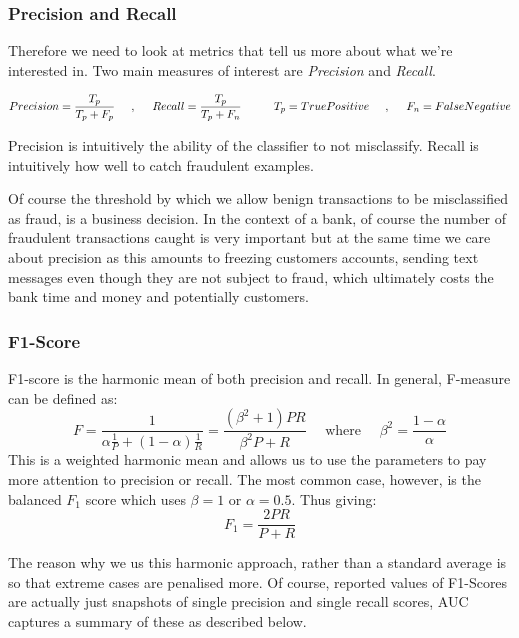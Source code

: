\documentclass[12pt,a4paper,twoside]{report}
\begin{document}
\subsubsection{Precision and Recall}

Therefore we need to look at metrics that tell us more about what we're interested in. Two main measures of interest are \textit{Precision} and \textit{Recall}.

\[
    {Precision} = \frac{T_p}{T_p+F_p} \hspace{5mm} , \hspace{5mm} {Recall} = \frac{T_p}{T_p+F_n} \hspace{1cm}  {T_p} = {True Positive} \hspace{5mm},\hspace{5mm} {F_n} = {False Negative}
\]

Precision is intuitively the ability of the classifier to not misclassify. Recall is intuitively how well to catch fraudulent examples. 

Of course the threshold by which we allow benign transactions to be misclassified as fraud, is a business decision. In the context of a bank, of course the number of fraudulent transactions caught is very important but at the same time we care about precision as this amounts to freezing customers accounts, sending text messages even though they are not subject to fraud, which ultimately costs the bank time and money and potentially customers.

\subsubsection{F1-Score}

F1-score is the harmonic mean of both precision and recall. In general, F-measure can be defined as:
$$F = \frac { 1} { \alpha \frac { 1} { P } + ( 1- \alpha ) \frac { 1} { R } } = \frac { \left( \beta ^ { 2} + 1\right) P R } { \beta ^ { 2} P + R } \quad \text{ where } \quad \beta ^ { 2} = \frac { 1- \alpha } { \alpha }$$
This is a weighted harmonic mean and allows us to use the parameters to pay more attention to precision or recall. The most common case, however, is the balanced $F_1$ score which uses $\beta = 1$ or $\alpha=0.5.$
Thus giving:
$$F _ { 1} = \frac { 2P R } { P + R }$$

The reason why we us this harmonic approach, rather than a standard average is so that extreme cases are penalised more. Of course, reported values of F1-Scores are actually just snapshots of single precision and single recall scores, AUC captures a summary of these as described below. 
\end{document}
